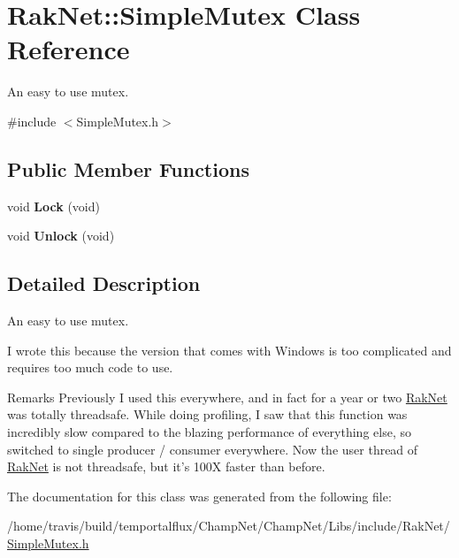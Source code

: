 \hypertarget{class_rak_net_1_1_simple_mutex}{\section{Rak\-Net\-:\-:Simple\-Mutex Class Reference}
\label{class_rak_net_1_1_simple_mutex}
}


An easy to use mutex.  




{\ttfamily \#include $<$Simple\-Mutex.\-h$>$}

\subsection*{Public Member Functions}
\begin{DoxyCompactItemize}
\item 
\hypertarget{class_rak_net_1_1_simple_mutex_a522ff1d052bc2639437d11c5fa99ed93}{void {\bfseries Lock} (void)}\label{class_rak_net_1_1_simple_mutex_a522ff1d052bc2639437d11c5fa99ed93}

\item 
\hypertarget{class_rak_net_1_1_simple_mutex_a9fbe11373018314f3edea9f2a4cda7ad}{void {\bfseries Unlock} (void)}\label{class_rak_net_1_1_simple_mutex_a9fbe11373018314f3edea9f2a4cda7ad}

\end{DoxyCompactItemize}


\subsection{Detailed Description}
An easy to use mutex. 

I wrote this because the version that comes with Windows is too complicated and requires too much code to use. \begin{DoxyRemark}{Remarks}
Previously I used this everywhere, and in fact for a year or two \hyperlink{namespace_rak_net}{Rak\-Net} was totally threadsafe. While doing profiling, I saw that this function was incredibly slow compared to the blazing performance of everything else, so switched to single producer / consumer everywhere. Now the user thread of \hyperlink{namespace_rak_net}{Rak\-Net} is not threadsafe, but it's 100\-X faster than before. 
\end{DoxyRemark}


The documentation for this class was generated from the following file\-:\begin{DoxyCompactItemize}
\item 
/home/travis/build/temportalflux/\-Champ\-Net/\-Champ\-Net/\-Libs/include/\-Rak\-Net/\hyperlink{_simple_mutex_8h}{Simple\-Mutex.\-h}\end{DoxyCompactItemize}
